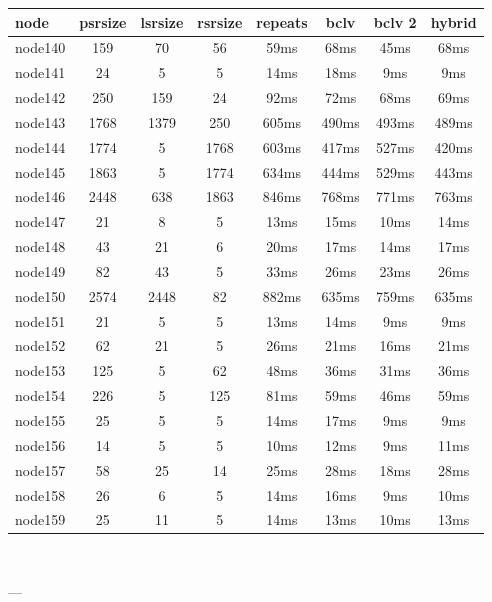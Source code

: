 \begin{tabular}{|l|c|c|c|c|c|c|c|}
\hline node & psrsize & lsrsize & rsrsize   & repeats & bclv & bclv 2 & hybrid\\
    \hline node140 & 159 & 70 & 56 & 59ms & 68ms & 45ms & 68ms\\
    \hline node141 & 24 & 5 & 5 & 14ms & 18ms & 9ms & 9ms\\
    \hline node142 & 250 & 159 & 24 & 92ms & 72ms & 68ms & 69ms\\
    \hline node143 & 1768 & 1379 & 250 & 605ms & 490ms & 493ms & 489ms\\
    \hline node144 & 1774 & 5 & 1768 & 603ms & 417ms & 527ms & 420ms\\
    \hline node145 & 1863 & 5 & 1774 & 634ms & 444ms & 529ms & 443ms\\
    \hline node146 & 2448 & 638 & 1863 & 846ms & 768ms & 771ms & 763ms\\
    \hline node147 & 21 & 8 & 5 & 13ms & 15ms & 10ms & 14ms\\
    \hline node148 & 43 & 21 & 6 & 20ms & 17ms & 14ms & 17ms\\
    \hline node149 & 82 & 43 & 5 & 33ms & 26ms & 23ms & 26ms\\
    \hline node150 & 2574 & 2448 & 82 & 882ms & 635ms & 759ms & 635ms\\
    \hline node151 & 21 & 5 & 5 & 13ms & 14ms & 9ms & 9ms\\
    \hline node152 & 62 & 21 & 5 & 26ms & 21ms & 16ms & 21ms\\
    \hline node153 & 125 & 5 & 62 & 48ms & 36ms & 31ms & 36ms\\
    \hline node154 & 226 & 5 & 125 & 81ms & 59ms & 46ms & 59ms\\
    \hline node155 & 25 & 5 & 5 & 14ms & 17ms & 9ms & 9ms\\
    \hline node156 & 14 & 5 & 5 & 10ms & 12ms & 9ms & 11ms\\
    \hline node157 & 58 & 25 & 14 & 25ms & 28ms & 18ms & 28ms\\
    \hline node158 & 26 & 6 & 5 & 14ms & 16ms & 9ms & 10ms\\
    \hline node159 & 25 & 11 & 5 & 14ms & 13ms & 10ms & 13ms\\

\hline
\end{tabular} \

---


